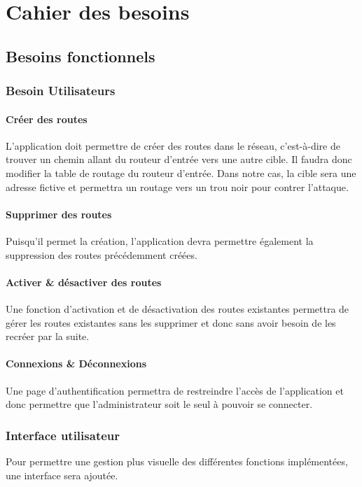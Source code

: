 \chapter{Cahier des besoins}

\section{Besoins fonctionnels}

\subsection{Besoin Utilisateurs}
\subsubsection{Créer des routes}
L'application doit permettre de créer des routes dans le réseau, c'est-à-dire de trouver un chemin allant du routeur d'entrée vers une autre cible. Il faudra donc modifier la table de routage du routeur d'entrée. Dans notre cas, la cible sera une adresse fictive et permettra un routage vers un trou noir pour contrer l'attaque.

\subsubsection{Supprimer des routes}
Puisqu'il permet la création, l'application devra permettre également la suppression des routes précédemment créées.

\subsubsection{Activer \& désactiver des routes}
Une fonction d'activation et de désactivation des routes existantes permettra de gérer les routes existantes sans les supprimer et donc sans avoir besoin de les recréer par la suite.

\subsubsection{Connexions \& Déconnexions}
Une page d'authentification permettra de restreindre l'accès de l'application et donc permettre que l'administrateur soit le seul à pouvoir se connecter.

\subsection{Interface utilisateur}
Pour permettre une gestion plus visuelle des différentes fonctions implémentées, une interface sera ajoutée. %

